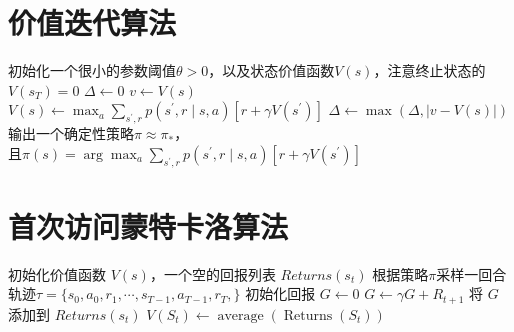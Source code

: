 \documentclass[11pt]{ctexart}
\begin{document}
\section{价值迭代算法}
\begin{algorithm}[H] %
	\renewcommand{\thealgorithm}{} %
	\caption{} 
	\begin{algorithmic}[1] %
		\STATE 初始化一个很小的参数阈值$\theta>0$，以及状态价值函数$V(s)$，注意终止状态的$V(s_T)=0$
		\REPEAT
			\STATE $\Delta \leftarrow 0$
			\REPEAT
				\STATE $v \leftarrow V(s)$
				\STATE $V(s) \leftarrow \max _a \sum_{s^{\prime}, r} p\left(s^{\prime}, r \mid s, a\right)\left[r+\gamma V\left(s^{\prime}\right)\right]$
				\STATE $\Delta \leftarrow \max (\Delta,|v-V(s)|)$
		\UNTIL{$\Delta < \theta$}
		\STATE 输出一个确定性策略$\pi \approx \pi_*$，\\ 且$\pi(s)=\arg \max _a \sum_{s^{\prime}, r} p\left(s^{\prime}, r \mid s, a\right)\left[r+\gamma V\left(s^{\prime}\right)\right]$
	\end{algorithmic}
\end{algorithm}
\clearpage
\section{首次访问蒙特卡洛算法}
\begin{algorithm}[H] %
	\renewcommand{\thealgorithm}{} %
	\caption{} 
	\begin{algorithmic}[1] %
		\STATE 初始化价值函数 $V(s)$，一个空的回报列表 $Returns(s_t)$
			\STATE 根据策略$\pi$采样一回合轨迹$\tau=\{s_0,a_0,r_1,\cdots,s_{T-1},a_{T-1},r_{T},\}$
			\STATE 初始化回报 $G \leftarrow 0$
				\STATE $G \leftarrow \gamma G + R_{t+1}$
				\REPEAT
					\STATE  将 $G$ 添加到 $Returns(s_t)$
					\STATE $V\left(S_t\right) \leftarrow \operatorname{average}\left(\operatorname{Returns}\left(S_t\right)\right)$
			\ENDFOR
		\ENDFOR
	\end{algorithmic}
\end{algorithm}
\clearpage
\end{document}
